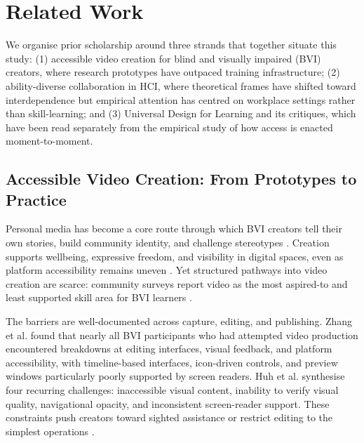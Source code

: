 \section{Related Work}

We organise prior scholarship around three strands that together situate this study: (1) accessible video creation for blind and visually impaired (BVI) creators, where research prototypes have outpaced training infrastructure; (2) ability-diverse collaboration in HCI, where theoretical frames have shifted toward interdependence but empirical attention has centred on workplace settings rather than skill-learning; and (3) Universal Design for Learning and its critiques, which have been read separately from the empirical study of how access is enacted moment-to-moment.

\subsection{Accessible Video Creation: From Prototypes to Practice}

Personal media has become a core route through which BVI creators tell their own stories, build community identity, and challenge stereotypes \cite{emara_its_2025,seo_understanding_2021,brylla_communicative_2024}. Creation supports wellbeing, expressive freedom, and visibility in digital spaces, even as platform accessibility remains uneven \cite{seo_understanding_2021,zhang_understanding_2023}. Yet structured pathways into video creation are scarce: community surveys report video as the most aspired-to and least supported skill area for BVI learners \cite{lyu_i_2024-1,zhang_understanding_2023}.

The barriers are well-documented across capture, editing, and publishing. Zhang et al. \cite{zhang_understanding_2023} found that nearly all BVI participants who had attempted video production encountered breakdowns at editing interfaces, visual feedback, and platform accessibility, with timeline-based interfaces, icon-driven controls, and preview windows particularly poorly supported by screen readers. Huh et al. \cite{huh_avscript_2023} synthesise four recurring challenges: inaccessible visual content, inability to verify visual quality, navigational opacity, and inconsistent screen-reader support. These constraints push creators toward sighted assistance or restrict editing to the simplest operations \cite{lyu_i_2024-1,xiao_understanding_2025,raymond_examination_2024}.

